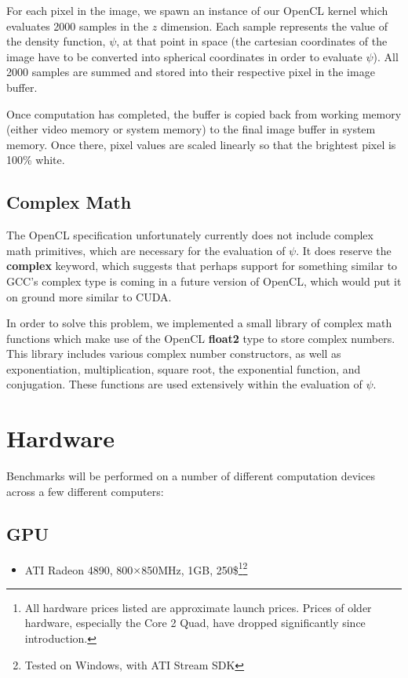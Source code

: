 \documentclass{acmsiggraph}
\begin{document}
For each pixel in the image, we spawn an instance of our OpenCL kernel which evaluates 2000 samples in the $z$ dimension. Each sample represents the value of the density function, $\psi$, at that point in space (the cartesian coordinates of the image have to be converted into spherical coordinates in order to evaluate $\psi$). All 2000 samples are summed and stored into their respective pixel in the image buffer.

Once computation has completed, the buffer is copied back from working memory (either video memory or system memory) to the final image buffer in system memory. Once there, pixel values are scaled linearly so that the brightest pixel is 100\% white.

\subsection{Complex Math}

The OpenCL specification unfortunately currently does not include complex math primitives, which are necessary for the evaluation of $\psi$. It does reserve the {\bf complex} keyword, which suggests that perhaps support for something similar to GCC's complex type is coming in a future version of OpenCL, which would put it on ground more similar to CUDA.

In order to solve this problem, we implemented a small library of complex math functions which make use of the OpenCL {\bf float2} type to store complex numbers. This library includes various complex number constructors, as well as exponentiation, multiplication, square root, the exponential function, and conjugation. These functions are used extensively within the evaluation of $\psi$.

\section{Hardware}

Benchmarks will be performed on a number of different computation devices across a few different computers:

\subsection{GPU}

\begin{itemize}

\item ATI Radeon 4890, 800$\times$850MHz, 1GB, 250\$\footnote{All hardware prices listed are approximate launch prices. Prices of older hardware, especially the Core 2 Quad, have dropped significantly since introduction.\label{fn:prices}}\footnote{Tested on Windows, with ATI Stream SDK\label{fn:windows}}

\end{itemize}
\end{document}

